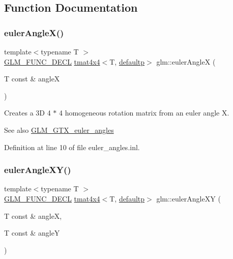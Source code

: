 \subsection{Function Documentation}
\mbox{\label{group__gtx__euler__angles_ga82cd3b8a04943f1a0d1a562aff358dc8}} 
\subsubsection{\texorpdfstring{eulerAngleX()}{eulerAngleX()}}
{\footnotesize\ttfamily template$<$typename T $>$ \\
\mbox{\hyperlink{setup_8hpp_ab2d052de21a70539923e9bcbf6e83a51}{G\+L\+M\+\_\+\+F\+U\+N\+C\+\_\+\+D\+E\+CL}} \mbox{\hyperlink{structglm_1_1tmat4x4}{tmat4x4}}$<$T, \mbox{\hyperlink{namespaceglm_a0f04f086094c747d227af4425893f545a9d21ccd8b5a009ec7eb7677befc3bf51}{defaultp}}$>$ glm\+::euler\+AngleX (\begin{DoxyParamCaption}\item[{T const \&}]{angleX }\end{DoxyParamCaption})}

Creates a 3D 4 $\ast$ 4 homogeneous rotation matrix from an euler angle X. \begin{DoxySeeAlso}{See also}
\mbox{\hyperlink{group__gtx__euler__angles}{G\+L\+M\+\_\+\+G\+T\+X\+\_\+euler\+\_\+angles}} 
\end{DoxySeeAlso}


Definition at line 10 of file euler\+\_\+angles.\+inl.

\mbox{\label{group__gtx__euler__angles_ga8bf84f92ca976a7f50dbe4b30ceb72dd}} 
\subsubsection{\texorpdfstring{eulerAngleXY()}{eulerAngleXY()}}
{\footnotesize\ttfamily template$<$typename T $>$ \\
\mbox{\hyperlink{setup_8hpp_ab2d052de21a70539923e9bcbf6e83a51}{G\+L\+M\+\_\+\+F\+U\+N\+C\+\_\+\+D\+E\+CL}} \mbox{\hyperlink{structglm_1_1tmat4x4}{tmat4x4}}$<$T, \mbox{\hyperlink{namespaceglm_a0f04f086094c747d227af4425893f545a9d21ccd8b5a009ec7eb7677befc3bf51}{defaultp}}$>$ glm\+::euler\+Angle\+XY (\begin{DoxyParamCaption}\item[{T const \&}]{angleX,  }\item[{T const \&}]{angleY }\end{DoxyParamCaption})}

